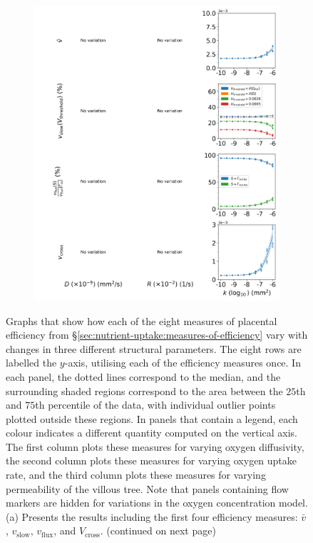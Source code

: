             \begin{figure}
                \vspace{-1.5cm}
                \centering
                \begin{subfigure}{\textwidth}
                    \includegraphics[width=\textwidth]{diagrams/results-variations/mega1_oxygen_diffusivity_oxygen_uptake_permeability.png}
                    \caption{}
                    \label{fig:mega-other2:1}
                \end{subfigure}
                \caption{Graphs that show how each of the eight measures of placental efficiency from \S\ref{sec:nutrient-uptake:measures-of-efficiency} vary with changes in three different structural parameters. The eight rows are labelled the $y$-axis, utilising each of the efficiency measures once. In each panel, the dotted lines correspond to the median, and the surrounding shaded regions correspond to the area between the $25$th and $75$th percentile of the data, with individual outlier points plotted outside these regions. In panels that contain a legend, each colour indicates a different quantity computed on the vertical axis. The first column plots these measures for varying oxygen diffusivity, the second column plots these measures for varying oxygen uptake rate, and the third column plots these measures for varying permeability of the villous tree. Note that panels containing flow markers are hidden for variations in the oxygen concentration model. (a) Presents the results including the first four efficiency measures: $\bar{v}$, $v_\text{slow}$, $v_\text{flux}$, and $V_\text{cross}$. (continued on next page)}
            \end{figure}
